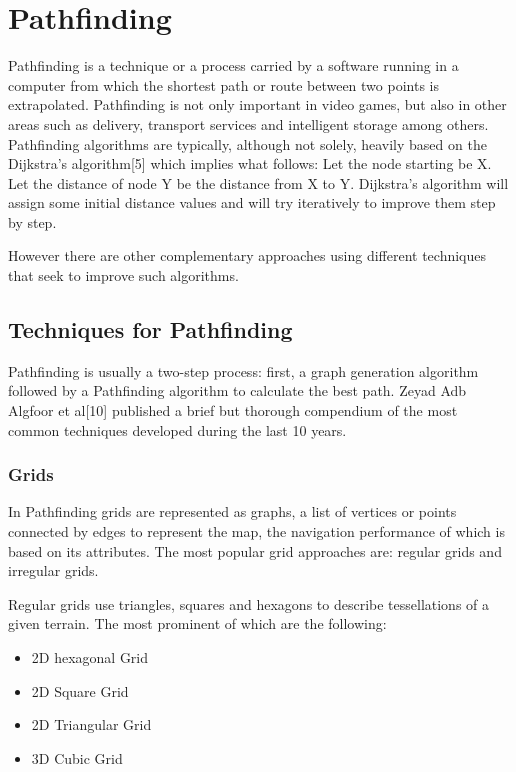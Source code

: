 \section{Pathfinding}

Pathfinding is a technique or a process carried by a software running in a computer from which the shortest path or route between two points is extrapolated. Pathfinding is not only important in video games, but also in other areas such as delivery, transport services and intelligent storage among others. Pathfinding algorithms are typically, although not solely, heavily based on the Dijkstra's algorithm[5] which implies what follows: Let the node starting be X. Let the distance of node Y be the distance from X to Y. Dijkstra's algorithm will assign some initial distance values and will try iteratively to improve them step by step.

\vspace{2mm}
However there are other complementary approaches using different techniques that seek to improve such algorithms.

\subsection{Techniques for Pathfinding}
Pathfinding is usually a two-step process: first, a graph generation algorithm followed by a Pathfinding algorithm to calculate the best path. Zeyad Adb Algfoor et al[10] published a brief but thorough compendium of the most common techniques developed during the last 10 years.


\subsubsection{Grids}
In Pathfinding grids are represented as graphs, a list of vertices or points connected by edges to represent the map, the navigation performance of which is based on its attributes. The most popular grid approaches are: regular grids and irregular grids.

\vspace{2mm}
Regular grids use triangles, squares and hexagons to describe tessellations of a given terrain. The most prominent of which are the following:

\begin{itemize}
	\item 2D hexagonal Grid
	\item 2D Square Grid
	\item 2D Triangular Grid
	\item 3D Cubic Grid
\end{itemize}

